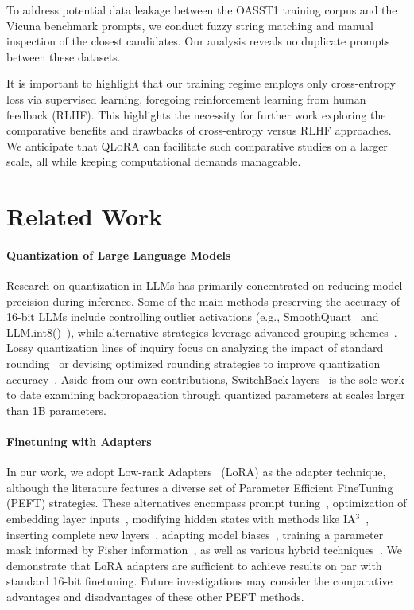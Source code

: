 To address potential data leakage between the OASST1 training corpus and the Vicuna benchmark prompts, we conduct fuzzy string matching and manual inspection of the closest candidates. Our analysis reveals no duplicate prompts between these datasets.

It is important to highlight that our training regime employs only cross-entropy loss via supervised learning, foregoing reinforcement learning from human feedback (RLHF). This highlights the necessity for further work exploring the comparative benefits and drawbacks of cross-entropy versus RLHF approaches. We anticipate that \textsc{QLoRA} can facilitate such comparative studies on a larger scale, all while keeping computational demands manageable.

\section{Related Work}

\paragraph{Quantization of Large Language Models} Research on quantization in LLMs has primarily concentrated on reducing model precision during inference. Some of the main methods preserving the accuracy of 16-bit LLMs include controlling outlier activations (e.g., SmoothQuant~\citep{xiao2022smoothquant} and LLM.int8()~\citep{dettmers2022llm}), while alternative strategies leverage advanced grouping schemes~\citep{park2022nuqmm, yao2022zeroquant}. Lossy quantization lines of inquiry focus on analyzing the impact of standard rounding~\citep{dettmers2022case,zeng2022glm,pope2022efficiently} or devising optimized rounding strategies to improve quantization accuracy~\citep{frantar2022gptq}. Aside from our own contributions, SwitchBack layers~\citep{wortsman2023stable} is the sole work to date examining backpropagation through quantized parameters at scales larger than 1B parameters.

\paragraph{Finetuning with Adapters} In our work, we adopt Low-rank Adapters~\citep{hu2021lora} (LoRA) as the adapter technique, although the literature features a diverse set of Parameter Efficient FineTuning (PEFT) strategies. These alternatives encompass prompt tuning~\citep{qin2021learning,lester2021power,li2021prefix}, optimization of embedding layer inputs~\citep{an2022input}, modifying hidden states with methods like IA$^3$~\citep{liu2022few}, inserting complete new layers~\citep{houlsby2019parameter}, adapting model biases~\citep{zaken2021bitfit}, training a parameter mask informed by Fisher information~\citep{sung2021training}, as well as various hybrid techniques~\citep{henderson2021compacter}. We demonstrate that LoRA adapters are sufficient to achieve results on par with standard 16-bit finetuning. Future investigations may consider the comparative advantages and disadvantages of these other PEFT methods.

